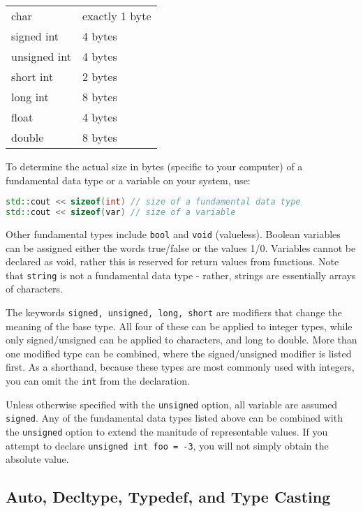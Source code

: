 \documentclass[10pt]{article}
\begin{document}
\begin{center}
\begin{tabular} {l l}
char & exactly 1 byte \\
signed int & 4 bytes\\
unsigned int & 4 bytes\\
short int & 2 bytes\\
long int & 8 bytes\\
float & 4 bytes\\
double & 8 bytes\\
\end{tabular}
\end{center}

To determine the actual size in bytes (specific to your computer) of a fundamental data type or a variable on your system, use:

\begin{lstlisting}[language=C++]
std::cout << sizeof(int) // size of a fundamental data type
std::cout << sizeof(var) // size of a variable
\end{lstlisting}

Other fundamental types include \texttt{bool} and \texttt{void} (valueless). Boolean variables can be assigned either the words true/false or the values 1/0. Variables cannot be declared as void, rather this is reserved for return values from functions. Note that \texttt{string} is not a fundamental data type - rather, strings are essentially arrays of characters.

The keywords \texttt{signed, unsigned, long, short} are modifiers that change the meaning of the base type. All four of these can be applied to integer types, while only signed/unsigned can be applied to characters, and long to double. More than one modified type can be combined, where the signed/unsigned modifier is listed first. As a shorthand, because these types are most commonly used with integers, you can omit the \texttt{int} from the declaration.

Unless otherwise specified with the \texttt{unsigned} option, all variable are assumed \texttt{signed}. Any of the fundamental data types listed above can be combined with the \texttt{unsigned} option to extend the manitude of representable values. If you attempt to declare \texttt{unsigned int foo = -3}, you will not simply obtain the absolute value.

\subsection{Auto, Decltype, Typedef, and Type Casting}
\end{document}
